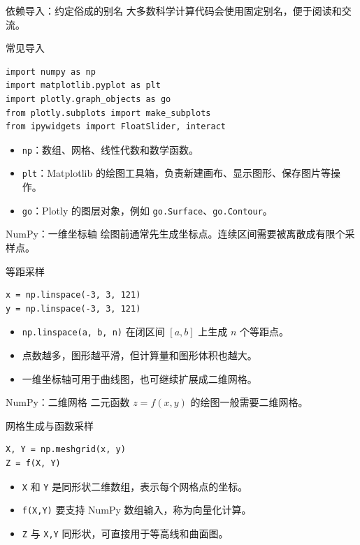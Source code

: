 \documentclass[aspectratio=169,11pt]{ctexbeamer}
\begin{document}
\begin{frame}[fragile]{依赖导入：约定俗成的别名}
  大多数科学计算代码会使用固定别名，便于阅读和交流。

  \begin{block}{常见导入}
\begin{Verbatim}[fontsize=\small]
import numpy as np
import matplotlib.pyplot as plt
import plotly.graph_objects as go
from plotly.subplots import make_subplots
from ipywidgets import FloatSlider, interact
\end{Verbatim}
  \end{block}

  \begin{itemize}
    \item \texttt{np}：数组、网格、线性代数和数学函数。
    \item \texttt{plt}：Matplotlib 的绘图工具箱，负责新建画布、显示图形、保存图片等操作。
    \item \texttt{go}：Plotly 的图层对象，例如 \texttt{go.Surface}、\texttt{go.Contour}。
  \end{itemize}
\end{frame}

\begin{frame}[fragile]{NumPy：一维坐标轴}
  绘图前通常先生成坐标点。连续区间需要被离散成有限个采样点。

  \begin{block}{等距采样}
\begin{Verbatim}[fontsize=\small]
x = np.linspace(-3, 3, 121)
y = np.linspace(-3, 3, 121)
\end{Verbatim}
  \end{block}

  \begin{itemize}
    \item \texttt{np.linspace(a, b, n)} 在闭区间 \([a,b]\) 上生成 \(n\) 个等距点。
    \item 点数越多，图形越平滑，但计算量和图形体积也越大。
    \item 一维坐标轴可用于曲线图，也可继续扩展成二维网格。
  \end{itemize}
\end{frame}

\begin{frame}[fragile]{NumPy：二维网格}
  二元函数 \(z=f(x,y)\) 的绘图一般需要二维网格。

  \begin{block}{网格生成与函数采样}
\begin{Verbatim}[fontsize=\small]
X, Y = np.meshgrid(x, y)
Z = f(X, Y)
\end{Verbatim}
  \end{block}

  \begin{itemize}
    \item \texttt{X} 和 \texttt{Y} 是同形状二维数组，表示每个网格点的坐标。
    \item \texttt{f(X,Y)} 要支持 NumPy 数组输入，称为向量化计算。
    \item \texttt{Z} 与 \texttt{X,Y} 同形状，可直接用于等高线和曲面图。
  \end{itemize}
\end{frame}
\end{document}
